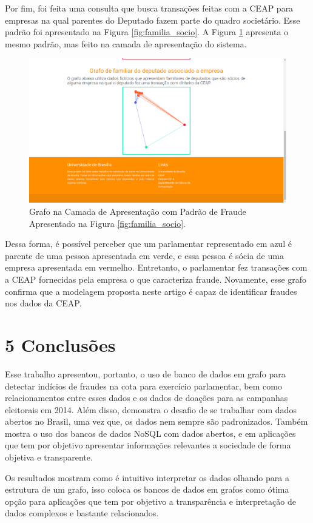 \documentclass[12pt]{article}
\begin{document}
Por fim, foi feita uma consulta que busca transações feitas com a CEAP para empresas na qual parentes do Deputado fazem parte do quadro societário. Esse padrão foi apresentado na Figura \ref{fig:familia_socio}. A Figura \ref{fig:familia_grafo} apresenta o mesmo padrão, mas feito na camada de apresentação do sistema.

\begin{figure}[ht]
\centering
\includegraphics[width=.6\textwidth]{familia.png}
\caption{Grafo na Camada de Apresentação com Padrão de Fraude Apresentado na Figura \ref{fig:familia_socio}.}
\label{fig:familia_grafo}
\end{figure}

Dessa forma, é possível perceber que um parlamentar representado em azul é parente de uma pessoa apresentada em verde, e essa pessoa é sócia de uma empresa apresentada em vermelho. Entretanto, o parlamentar fez transações com a CEAP fornecidas pela empresa o que caracteriza fraude. Novamente, esse grafo confirma que a modelagem proposta neste artigo é capaz de identificar fraudes nos dados da CEAP. 

\section{5 Conclusões} \label{sec:conclusao}

Esse trabalho apresentou, portanto, o uso de banco de dados em grafo para detectar indícios de fraudes na cota para exercício parlamentar, bem como relacionamentos entre esses dados e os dados de doações para as campanhas eleitorais em 2014. Além disso, demonstra o desafio de se trabalhar com dados abertos no Brasil, uma vez que, os dados nem sempre são padronizados. Também mostra o uso dos bancos de dados NoSQL com dados abertos, e em aplicações que tem por objetivo apresentar informações relevantes a sociedade de forma objetiva e transparente.

Os resultados mostram como é intuitivo interpretar os dados olhando para a estrutura de um grafo, isso coloca os bancos de dados em grafos como ótima opção para aplicações que tem por objetivo a transparência e interpretação de dados complexos e bastante relacionados.
\end{document}
